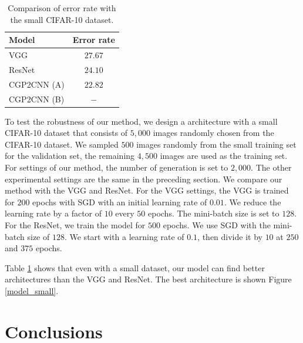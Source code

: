 \begin{table}[t]
  \caption{Comparison of error rate with the small CIFAR-10 dataset.}
  \label{results_small}
  \begin{tabular}{l|c} \hline
    Model & Error rate \\ \hline
   VGG \cite{simonyan_very_2014} & $27.67$ \\
   ResNet \cite{he_deep_2016} & $24.10$ \\ 
   CGP2CNN (A) & $22.82$  \\
   CGP2CNN (B) & $-$ \\ \hline
  \end{tabular}
\end{table}


To test the robustness of our method, we design a architecture with a small CIFAR-10 dataset that consists of $5,000$ images randomly chosen from the CIFAR-10 dataset. 
We sampled $500$ images randomly from the small training set for the validation set, the remaining $4,500$ images are used as the training set.
For settings of our method, the number of generation is set to $2,000$.
The other experimental settings are the same in the preceding section.
We compare our method with the VGG and ResNet.
For the VGG settings, the VGG is trained for $200$ epochs with SGD with an initial learning rate of $0.01$.
We reduce the learning rate by a factor of $10$ every $50$ epochs.
The mini-batch size is set to $128$.
For the ResNet, we train the model for $500$ epochs.
We use SGD with the mini-batch size of $128$.
We start with a learning rate of $0.1$, then divide it by $10$ at $250$ and $375$ epochs.

Table \ref{results_small} shows that even with a small dataset, our model can find better architectures than the VGG and ResNet.
The best architecture is shown Figure \ref{model_small}.

\section{Conclusions}


